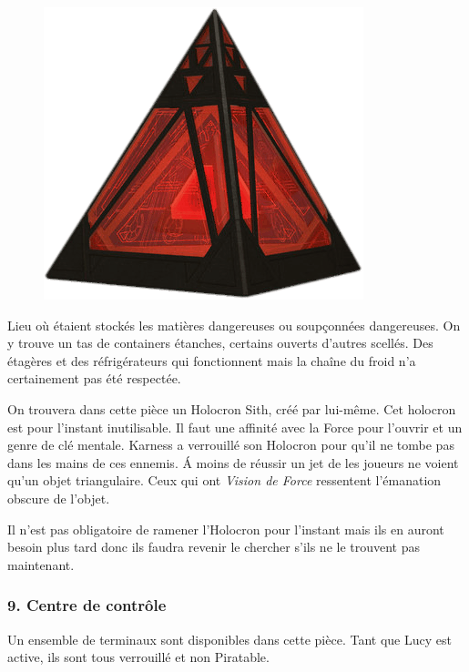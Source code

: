 \begin{figure}
    \vspace{-5\baselineskip}
    \centering\includegraphics[width=\linewidth]{_img/holocron-sith.png}
    \vspace{-2\baselineskip} 
\end{figure}
Lieu où étaient stockés les matières dangereuses ou soupçonnées dangereuses. On y trouve un tas de containers étanches, certains ouverts d’autres scellés. Des étagères et des réfrigérateurs qui fonctionnent mais la chaîne du froid n’a certainement pas été respectée.

On trouvera dans cette pièce un Holocron Sith, créé par  lui-même. Cet holocron est pour l’instant inutilisable. Il faut une affinité avec la Force pour l’ouvrir et un genre de clé mentale. Karness a verrouillé son Holocron pour qu’il ne tombe pas dans les mains de ces ennemis. \'A moins de réussir un jet de  les joueurs ne voient qu’un objet triangulaire. Ceux qui ont \textit{Vision de Force} ressentent l’émanation obscure de l’objet.

Il n’est pas obligatoire de ramener l’Holocron pour l’instant mais ils en auront besoin plus tard donc ils faudra revenir le chercher s’ils ne le trouvent pas maintenant.

\subsubsection{9. Centre de contrôle}
Un ensemble de terminaux sont disponibles dans cette pièce. Tant que Lucy est active, ils sont tous verrouillé et non Piratable.


